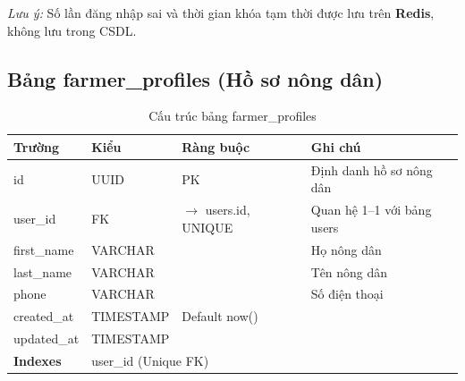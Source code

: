 \documentclass[12pt,a4paper]{article}
\begin{document}
\textit{Lưu ý:} Số lần đăng nhập sai và thời gian khóa tạm thời được lưu trên \textbf{Redis}, không lưu trong CSDL.

\subsection{Bảng farmer\_profiles (Hồ sơ nông dân)}
\begin{longtable}{|l|l|l|p{5.5cm}|}
    \caption{Cấu trúc bảng farmer\_profiles}                                                                                    \\
    \hline
    \rowcolor{headerblue}
    \textbf{Trường}  & \textbf{Kiểu}                             & \textbf{Ràng buộc}             & \textbf{Ghi chú}            \\
    \hline
    id               & UUID                                      & PK                             & Định danh hồ sơ nông dân    \\
    \hline
    user\_id         & FK                                        & $\rightarrow$ users.id, UNIQUE & Quan hệ 1--1 với bảng users \\
    \hline
    first\_name      & VARCHAR                                   &                                & Họ nông dân                 \\
    \hline
    last\_name       & VARCHAR                                   &                                & Tên nông dân                \\
    \hline
    phone            & VARCHAR                                   &                                & Số điện thoại               \\
    \hline
    created\_at      & TIMESTAMP                                 & Default now()                  &                             \\
    \hline
    updated\_at      & TIMESTAMP                                 &                                &                             \\
    \hline
    \rowcolor{headerblue}
    \textbf{Indexes} & \multicolumn{3}{l|}{user\_id (Unique FK)}                                                                \\
    \hline
\end{longtable}
\end{document}

